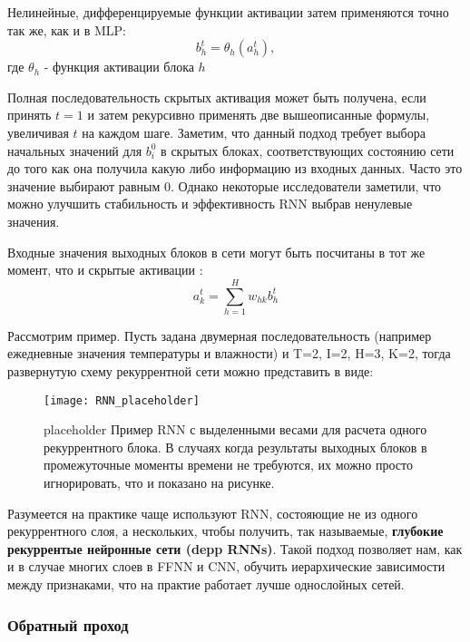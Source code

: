 Нелинейные, дифференцируемые функции активации затем применяются точно так же, как 
и в MLP:
\begin{equation*}
    b_h^t = \theta_h (a_h^t),
\end{equation*}
где $\theta_h$ - функция активации блока $h$

Полная последовательность скрытых активация может быть получена, если принять 
$t=1$ и затем рекурсивно применять две вышеописанные формулы, увеличивая $t$ 
на каждом шаге. Заметим, что данный подход требует выбора начальных значений 
для $b_i^0$ в скрытых блоках, соответствующих состоянию сети до того как 
она получила какую либо информацию из входных данных. Часто это значение 
выбирают равным 0. Однако некоторые исследователи заметили, что можно улучшить 
стабильность и эффективность RNN выбрав ненулевые значения.

Входные значения выходных блоков в сети могут быть посчитаны в тот же момент, что 
и скрытые активации \cite{graves}:
\begin{equation*}
    a_k^t = \sum_{h=1}^H w_{hk} b_h^t
\end{equation*}

\newpage

Рассмотрим пример. Пусть задана двумерная последовательность 
(например ежедневные значения температуры и влажности) и T=2, I=2, H=3, K=2, 
тогда развернутую схему рекуррентной сети можно представить в виде:
\begin{figure}[h!]
    \centering
    \texttt{[image: RNN\_placeholder]}
    \caption{{\color{red} placeholder} Пример RNN с выделенными весами для 
    расчета одного рекуррентного блока. В случаях когда результаты 
    выходных блоков в промежуточные моменты времени не требуются, их 
    можно просто игнорировать, что и показано на рисунке.}
    \label{fig:RNN_placeholder}
\end{figure}

Разумеется на практике чаще используют RNN, состояющие не из одного 
рекуррентного слоя, а нескольких, чтобы получить, так называемые, 
\textbf{глубокие рекуррентые нейронные сети (depp RNNs)}. Такой подход 
позволяет нам, как и в случае многих слоев в FFNN и CNN, 
обучить иерархические зависимости между признаками, что на практие 
работает лучше однослойных сетей. 

\subsubsection{Обратный проход}

